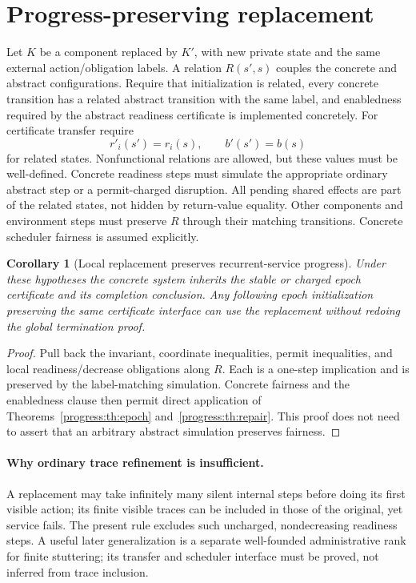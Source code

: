 \documentclass[11pt]{article}
\newtheorem{corollary}[theorem]{Corollary}
\begin{document}
\section{Progress-preserving replacement}
Let $K$ be a component replaced by $K'$, with new private state and the same external action/obligation labels. A relation $R(s',s)$ couples the concrete and abstract configurations. Require that initialization is related, every concrete transition has a related abstract transition with the same label, and enabledness required by the abstract readiness certificate is implemented concretely. For certificate transfer require
\[
 r'_i(s')=r_i(s),\qquad b'(s')=b(s)
\]
for related states. Nonfunctional relations are allowed, but these values must be well-defined. Concrete readiness steps must simulate the appropriate ordinary abstract step or a permit-charged disruption. All pending shared effects are part of the related states, not hidden by return-value equality. Other components and environment steps must preserve $R$ through their matching transitions. Concrete scheduler fairness is assumed explicitly.

\begin{corollary}[Local replacement preserves recurrent-service progress]\label{progress:cor:replacement}
Under these hypotheses the concrete system inherits the stable or charged epoch certificate and its completion conclusion. Any following epoch initialization preserving the same certificate interface can use the replacement without redoing the global termination proof.
\end{corollary}
\begin{proof}
Pull back the invariant, coordinate inequalities, permit inequalities, and local readiness/decrease obligations along $R$. Each is a one-step implication and is preserved by the label-matching simulation. Concrete fairness and the enabledness clause then permit direct application of Theorems~\ref{progress:th:epoch} and~\ref{progress:th:repair}. This proof does not need to assert that an arbitrary abstract simulation preserves fairness.
\end{proof}
\paragraph{Why ordinary trace refinement is insufficient.} A replacement may take infinitely many silent internal steps before doing its first visible action; its finite visible traces can be included in those of the original, yet service fails. The present rule excludes such uncharged, nondecreasing readiness steps. A useful later generalization is a separate well-founded administrative rank for finite stuttering; its transfer and scheduler interface must be proved, not inferred from trace inclusion.
\end{document}
